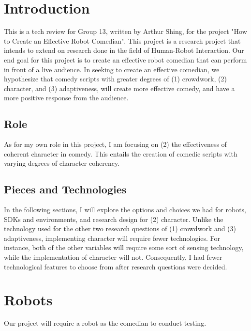 \documentclass[onecolumn, draftclsnofoot,10pt, compsoc]{IEEEtran}
\begin{document}


\section{Introduction}

This is a tech review for Group 13, written by Arthur Shing, for the project "How to Create an Effective Robot Comedian".
This project is a research project that intends to extend on research done in the field of Human-Robot Interaction.
Our end goal for this project is to create an effective robot comedian that can perform in front of a live audience.
In seeking to create an effective comedian, we hypothesize that comedy scripts with greater degrees of (1) crowdwork, (2) character, and (3) adaptiveness, will create more effective comedy, and have a more positive response from the audience.

\subsection{Role}
As for my own role in this project, I am focusing on (2) the effectiveness of coherent character in comedy.
This entails the creation of comedic scripts with varying degrees of character coherency.

\subsection{Pieces and Technologies}
In the following sections, I will explore the options and choices we had for robots, SDKs and environments, and research design for (2) character. Unlike the technology used for the other two research questions of (1) crowdwork and (3) adaptiveness, implementing character will require fewer technologies. For instance, both of the other variables will require some sort of sensing technology, while the implementation of character will not. Consequently, I had fewer technological features to choose from after research questions were decided.


\section{Robots}
Our project will require a robot as the comedian to conduct testing.
\end{document}
